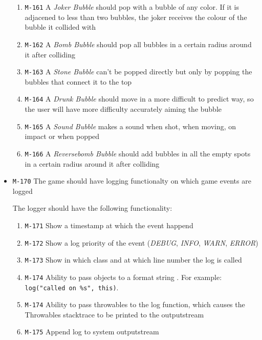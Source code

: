 \documentclass[a4paper]{article}
\begin{document}
\begin{itemize}
          \begin{enumerate}
          \item \texttt{M-161} A \textit{Joker Bubble} should pop with a bubble of any color. If it is adjacened to less than two bubbles, the joker receives the colour of the bubble it collided with
          \item \texttt{M-162} A \textit{Bomb Bubble} should pop all bubbles in a certain radius around it after colliding
          \item \texttt{M-163} A \textit{Stone Bubble} can't be popped directly but only by popping the bubbles that connect it to the top
          \item \texttt{M-164} A \textit{Drunk Bubble} should move in a more difficult to predict way, so the user will have more difficulty accurately aiming the bubble
		 
          \item \texttt{M-165} A \textit{Sound Bubble} makes a sound when shot, when moving, on impact or when popped
          \item \texttt{M-166} A \textit{Reversebomb Bubble} should add bubbles in all the empty spots in a certain radius around it after colliding
      \end{enumerate}
 
  
  
  
  \item \texttt{M-170} The game should have logging functionalty on which game events are logged
  
  The logger should have the following functionality:
       \begin{enumerate}
          \item \texttt{M-171} Show a timestamp at which the event happend
          \item \texttt{M-172} Show a log priority \citep{apachelog} of the event (\textit{DEBUG}, \textit{INFO}, \textit{WARN}, \textit{ERROR})
          \item \texttt{M-173} Show in which class and at which line number the log is called
          \item \texttt{M-174} Ability to pass objects to a format string \citep{formatstring}. For example: \texttt{log("called on \%s", this)}.
          \item \texttt{M-174} Ability to pass throwables to the log function, which causes
          the Throwables stacktrace to be printed to the outputstream \citep{throwable}
          \item \texttt{M-175} Append log to system outputstream
      \end{enumerate} 
  

\end{itemize}
\end{document}
